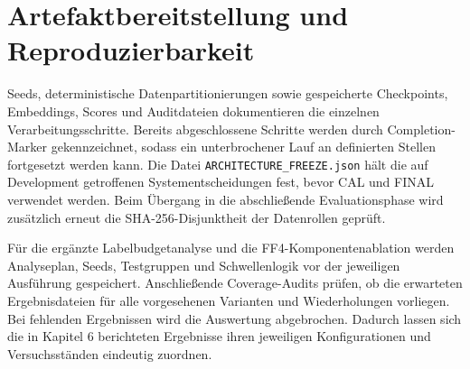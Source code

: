 \section{Artefaktbereitstellung und Reproduzierbarkeit}

Seeds, deterministische Datenpartitionierungen sowie gespeicherte Checkpoints, Embeddings,
Scores und Auditdateien dokumentieren die einzelnen Verarbeitungsschritte. Bereits
abgeschlossene Schritte werden durch Completion-Marker gekennzeichnet, sodass ein
unterbrochener Lauf an definierten Stellen fortgesetzt werden kann. Die Datei
\nolinkurl{ARCHITECTURE_FREEZE.json} hält die auf Development getroffenen
Systementscheidungen fest, bevor CAL und FINAL verwendet werden. Beim Übergang in die
abschließende Evaluationsphase wird zusätzlich erneut die SHA-256-Disjunktheit der
Datenrollen geprüft.

Für die ergänzte Labelbudgetanalyse und die FF4-Komponentenablation werden Analyseplan,
Seeds, Testgruppen und Schwellenlogik vor der jeweiligen Ausführung gespeichert.
Anschließende Coverage-Audits prüfen, ob die erwarteten Ergebnisdateien für alle vorgesehenen
Varianten und Wiederholungen vorliegen. Bei fehlenden Ergebnissen wird die Auswertung
abgebrochen. Dadurch lassen sich die in Kapitel 6 berichteten Ergebnisse ihren jeweiligen
Konfigurationen und Versuchsständen eindeutig zuordnen.
